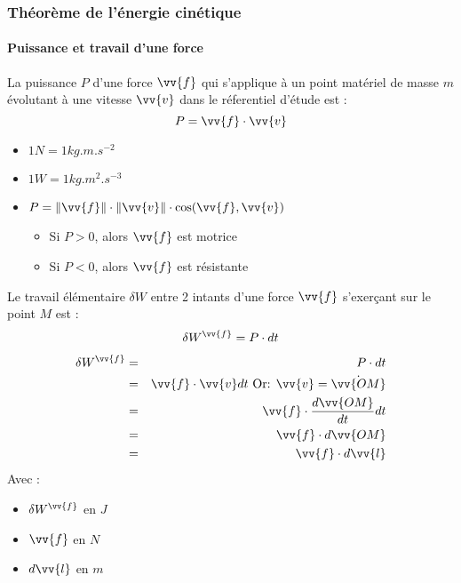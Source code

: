 \subsubsection{Théorème de l'énergie cinétique}
\paragraph{Puissance et travail d'une force}

\begin{definition}
    La puissance \(P\) d'une force \(\vv{f}\) qui s'applique à un point matériel de masse \(m\) évolutant à une vitesse \(\vv{v}\) dans le réferentiel d'étude est : 
    \[
        P = \vv{f} \cdot \vv{v}
    \]  
\end{definition}

\begin{remark}[Remarques]
    \begin{itemize}
        \item \(1\unit{N} = 1\unit{kg.m.s^{-2}}\)
        \item \(1\unit{W} = 1\unit{kg.m^{2}.s^{-3}}\)
        \item  \(P = \lVert \vv{f} \rVert \cdot \lVert \vv{v} \rVert \cdot \cos (\vv{f},\vv{v})  \)
        \begin{itemize}
            \item Si \(P>0\), alors \(\vv{f}\) est motrice
            \item Si \(P<0\), alors \(\vv{f}\) est résistante  
        \end{itemize} 
    \end{itemize}
\end{remark}


\begin{definition}
    Le travail élémentaire \(\delta W\) entre 2 intants d'une force \(\vv{f}\) s'exerçant sur le point \(M\) est : 
    \[
        \delta W^{\vv{f}} = P \cdot dt
    \]   
    \begin{corollary}
        \begin{eqnarray*}
            \delta W^{\vv{f}} &=& P \cdot dt \\
            &=& \vv{f} \cdot \vv{v} dt \text{ Or: } \vv{v} = \dot{\vv{OM}}\\
            &=& \vv{f} \cdot \frac{d \vv{OM}}{dt} dt \\
            &=& \vv{f} \cdot d \vv{OM} \\
            &=& \vv{f} \cdot d\vv{l}
        \end{eqnarray*}
        Avec : 
        \begin{itemize}
            \item \(\delta W^{\vv{f}}\) en \(\unit{J}\)
            \item \(\vv{f}\) en \(\unit{N}\)
            \item \(d\vv{l}\) en \(\unit{m}\)     
        \end{itemize}
    \end{corollary}
\end{definition}

